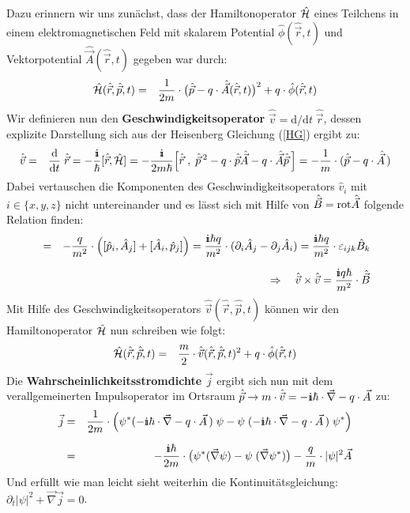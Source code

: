 Dazu erinnern wir uns zunächst, dass der Hamiltonoperator $\hat{\mathcal H}$ eines Teilchens in einem elektromagnetischen Feld mit skalarem Potential $\hat{\phi}(\hat{\vec{r}},t)$ und Vektorpotential $\hat{\vec{A}}(\hat{\vec{r}},t)$ gegeben war durch:
\begin{eqnarray*}
	\hat{\mathcal H}(\hat{\vec{r}},\hat{\vec{p}},t) &=& \frac{1}{2m}\cdot \big(\hat{\vec{p}}-q\cdot\hat{\vec{A}}(\hat{\vec{r}},t)\big)^2 + q\cdot\hat{\phi}(\hat{\vec{r}},t)
\end{eqnarray*}
Wir definieren nun den {\bf Geschwindigkeitsoperator} $\hat{\vec{v}}=\mathrm{d}/\mathrm{d}t\;\hat{\vec{r}}$, dessen explizite Darstellung sich aus der Heisenberg Gleichung (\ref{HG}) ergibt zu: 
\begin{eqnarray*}
	\hat{\vec{v}} &=& \frac{\mathrm{d}}{\mathrm{d}t}\;\hat{\vec{r}} = - \frac{\I}{\hbar} [\hat{\vec{r}},\hat{\ham}] = -\frac{\I}{2m\hbar}\Big[\hat{\vec{r}}\;,\;\hat{\vec{p}}\,^2-q\cdot\hat{\vec{p}}\hat{\vec{A}}- q\cdot\hat{\vec{A}}\hat{\vec{p}}\,\Big] = -\frac{1}{m}\cdot(\hat{\vec{p}}-q\cdot \hat{\vec{A}}\,)
\end{eqnarray*} 
Dabei vertauschen die Komponenten des Geschwindigkeitsoperators $\hat{v}_i$ mit $i\in\{x,y,z\}$ nicht untereinander und es lässt sich mit Hilfe von $\hat{\vec{B}}=\text{rot}\hat{\vec{A}}$ folgende Relation finden: 
\begin{eqnarray*}
	[\hat{v}_i,\hat{v}_j] &=& -\frac{q}{m^2}\cdot \underset{\;}{\Big(} [\hat{p}_i,\hat{A}_j] + [\hat{A}_i,\hat{p}_j] \Big) = \frac{\I\hbar q}{m^2}\cdot(\partial_i\hat{A}_j-\partial_j\hat{A}_i) = \frac{\I\hbar q}{m^2}\cdot \varepsilon_{ijk}\hat{B}_k
	\\
	&&\Rightarrow\quad \hat{\vec{v}}\times\hat{\vec{v}} = \frac{\I q\hbar}{m^2}\cdot \hat{\vec{B}}
\end{eqnarray*} 
Mit Hilfe des Geschwindigkeitsoperators $\hat{\vec{v}}(\hat{\vec{r}},\hat{\vec{p}},t)$ können wir den Hamiltonoperator $\hat{\mathcal H}$ nun schreiben wie folgt:
\begin{eqnarray*}
	\hat{\mathcal H}(\hat{\vec{r}},\hat{\vec{p}},t) &=& \frac{m}2\cdot\hat{\vec{v}}(\hat{\vec{r}},\hat{\vec{p}},t)^2 + q\cdot\hat{\phi}(\hat{\vec{r}},t) 
\end{eqnarray*}
Die {\bf Wahrscheinlichkeitsstromdichte} $\vec{j}$ ergibt sich nun mit dem verallgemeinerten Impulsoperator im Ortsraum $\hat{\vec{p}}\to m\cdot\hat{\vec{v}}=-\I\hbar\cdot\vec{\nabla}-q\cdot\vec{A}$ zu: 
\begin{eqnarray*}
	\vec{j} &=& \frac{1}{2m} \cdot\Big(\psi^*(-\I\hbar\cdot\vec{\nabla}-q\cdot\vec{A}\,)\;\psi - \psi\;(-\I\hbar\cdot\vec{\nabla}-q\cdot\vec{A}\,)\;\psi^*\underset{\;}{\Big)}
	\\
	&=& -\frac{\I\hbar}{2 m}\cdot\big(\psi^*(\vec{\nabla}\psi)-\psi\;(\vec{\nabla}\psi^*)\big) - \frac{q}{m} \cdot |\psi|^2 \vec{A}
\end{eqnarray*}
Und erfüllt wie man leicht sieht weiterhin die Kontinuitätsgleichung: $\partial_t |\psi|^2+\vec{\nabla}\vec{j}=0$.

